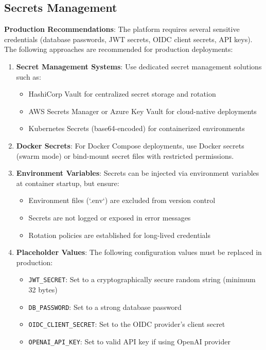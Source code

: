 \documentclass[a4paper,twoside]{sapthesis}
\begin{document}
\subsection{Secrets Management}
\label{app:config:secrets}

\textbf{Production Recommendations}: The platform requires several sensitive credentials (database passwords, JWT secrets, OIDC client secrets, API keys). The following approaches are recommended for production deployments:

\begin{enumerate}
    \item \textbf{Secret Management Systems}: Use dedicated secret management solutions such as:
    \begin{itemize}
        \item HashiCorp Vault for centralized secret storage and rotation
        \item AWS Secrets Manager or Azure Key Vault for cloud-native deployments
        \item Kubernetes Secrets (base64-encoded) for containerized environments
    \end{itemize}
    
    \item \textbf{Docker Secrets}: For Docker Compose deployments, use Docker secrets (swarm mode) or bind-mount secret files with restricted permissions.
    
    \item \textbf{Environment Variables}: Secrets can be injected via environment variables at container startup, but ensure:
    \begin{itemize}
        \item Environment files (`.env`) are excluded from version control
        \item Secrets are not logged or exposed in error messages
        \item Rotation policies are established for long-lived credentials
    \end{itemize}
    
    \item \textbf{Placeholder Values}: The following configuration values must be replaced in production:
    \begin{itemize}
        \item \texttt{JWT\_SECRET}: Set to a cryptographically secure random string (minimum 32 bytes)
        \item \texttt{DB\_PASSWORD}: Set to a strong database password
        \item \texttt{OIDC\_CLIENT\_SECRET}: Set to the OIDC provider's client secret
        \item \texttt{OPENAI\_API\_KEY}: Set to valid API key if using OpenAI provider
    \end{itemize}
\end{enumerate}
\end{document}
